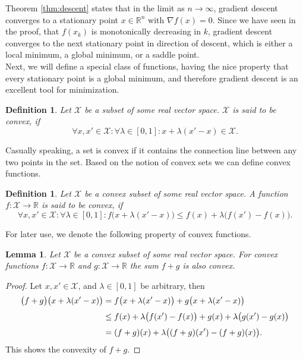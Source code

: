 \documentclass[11pt, a4paper]{article}
\newtheorem{lemma}[theorem]{Lemma}
\newtheorem{definition}[theorem]{Definition}
\newcommand{\R}{\mathbb{R}}
\newcommand{\X}{\mathcal{X}}
\begin{document}
Theorem \ref{thm:descent} states that in the limit as $n \to \infty$, gradient descent converges to a stationary point $x \in \R^n$ with $\nabla f(x) = 0$. Since we have seen in the proof, that $f(x_k)$ is monotonically decreasing in $k$, gradient descent converges to the next stationary point in direction of descent, which is either a local minimum, a global minimum, or a saddle point. \\

Next, we will define a special class of functions, having the nice property that every stationary point is a global minimum, and therefore gradient descent is an excellent tool for minimization.

\begin{definition}
Let $\X$ be a subset of some real vector space. $\X$ is said to be convex, if 
\[ \forall x, x' \in \X : \forall \lambda \in [0,1] : x + \lambda (x' - x) \in \X. \]
\end{definition}

Casually speaking, a set is convex if it contains the connection line between any two points in the set. Based on the notion of convex sets we can define convex functions.

\begin{definition}
Let $\X$ be a convex subset of some real vector space. A function $f: \X \to \R$ is said to be convex, if
\[ \forall x,x' \in \X : \forall \lambda \in [0,1] : f \big (x + \lambda (x'-x) \big ) \leq f(x) + \lambda \big ( f(x') - f(x) \big ). \]
\end{definition}

For later use, we denote the following property of convex functions.

\begin{lemma} \label{lem:convexity}
Let $\X$ be a convex subset of some real vector space. For convex functions $f: \X \to \R$ and $g: \X \to \R$ the sum $f+g$ is also convex.
\end{lemma}

\begin{proof}
Let $x,x' \in \X$, and $\lambda \in [0,1]$ be arbitrary, then
\[ \begin{split}
\big ( f+g \big ) \big (x + \lambda (x'-x) \big ) 
&= f \big ( x + \lambda (x'-x) \big ) + g \big (x + \lambda (x'-x) \big ) \\\
\textcolor{white}{\Big |} &\leq f(x) + \lambda \big ( f(x') - f(x) \big ) + g(x) + \lambda \big ( g(x') - g(x) \big ) \\\
&= ( f + g )(x) + \lambda \big ( (f + g)(x') - (f+g)(x) \big ).
\end{split} \]
This shows the convexity of $f+g$.
\end{proof}
\end{document}
